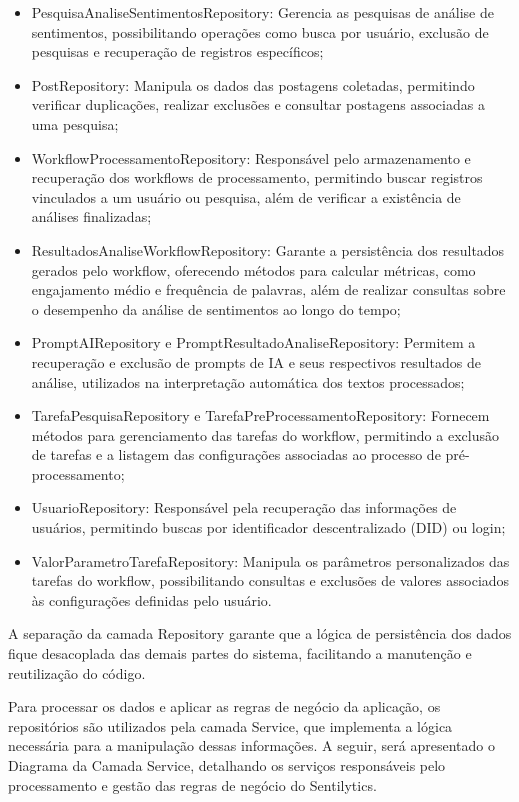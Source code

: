 \documentclass[
	12pt,				%
	oneside,			%
	a4paper,			%
	english,			%
	french,				%
	spanish,			%
	brazil				%
	]{abntex2}
\begin{document}
\begin{itemize}
\tightlist
\item
  PesquisaAnaliseSentimentosRepository: Gerencia as pesquisas de análise
  de sentimentos, possibilitando operações como busca por usuário,
  exclusão de pesquisas e recuperação de registros específicos;
\item
  PostRepository: Manipula os dados das postagens coletadas, permitindo
  verificar duplicações, realizar exclusões e consultar postagens
  associadas a uma pesquisa;
\item
  WorkflowProcessamentoRepository: Responsável pelo armazenamento e
  recuperação dos workflows de processamento, permitindo buscar
  registros vinculados a um usuário ou pesquisa, além de verificar a
  existência de análises finalizadas;
\item
  ResultadosAnaliseWorkflowRepository: Garante a persistência dos
  resultados gerados pelo workflow, oferecendo métodos para calcular
  métricas, como engajamento médio e frequência de palavras, além de
  realizar consultas sobre o desempenho da análise de sentimentos ao
  longo do tempo;
\item
  PromptAIRepository e PromptResultadoAnaliseRepository: Permitem a
  recuperação e exclusão de prompts de IA e seus respectivos resultados
  de análise, utilizados na interpretação automática dos textos
  processados;
\item
  TarefaPesquisaRepository e TarefaPreProcessamentoRepository: Fornecem
  métodos para gerenciamento das tarefas do workflow, permitindo a
  exclusão de tarefas e a listagem das configurações associadas ao
  processo de pré-processamento;
\item
  UsuarioRepository: Responsável pela recuperação das informações de
  usuários, permitindo buscas por identificador descentralizado (DID) ou
  login;
\item
  ValorParametroTarefaRepository: Manipula os parâmetros personalizados
  das tarefas do workflow, possibilitando consultas e exclusões de
  valores associados às configurações definidas pelo usuário.
\end{itemize}

A separação da camada Repository garante que a lógica de persistência
dos dados fique desacoplada das demais partes do sistema, facilitando a
manutenção e reutilização do código.

Para processar os dados e aplicar as regras de negócio da aplicação, os
repositórios são utilizados pela camada Service, que implementa a lógica
necessária para a manipulação dessas informações. A seguir, será
apresentado o Diagrama da Camada Service, detalhando os serviços
responsáveis pelo processamento e gestão das regras de negócio do
Sentilytics.
\end{document}
